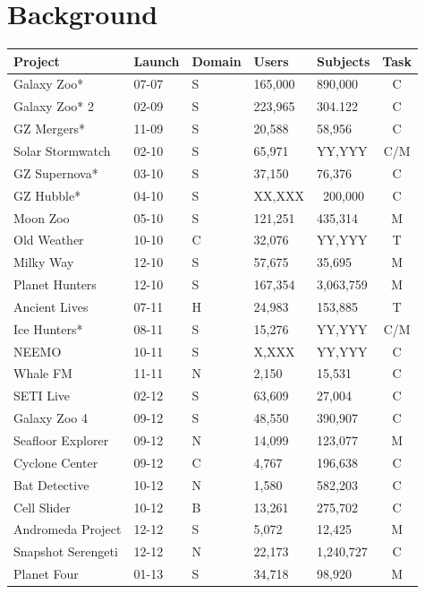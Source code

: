 \documentclass{sigchi}
\begin{document}
\section{Background}
\begin{table}
\begin{center}
\small
\begin{tabular}{p{2.2cm}lp{0.7cm}llc}
\hline
Project  & Launch & Domain & Users & Subjects & Task \\
\hline
\hline
Galaxy Zoo* & 07-07 & S & 165,000 & 890,000 & C \\
\hline
Galaxy Zoo* 2 & 02-09 & S & 223,965 & 304.122 & C \\
GZ Mergers* & 11-09 & S & 20,588 & 58,956 & C \\
\hline
Solar Stormwatch & 02-10 & S & 65,971 & YY,YYY & C/M \\
GZ Supernova* & 03-10 & S & 37,150 & 76,376 & C \\
GZ Hubble* & 04-10 & S & XX,XXX & ~200,000 & C \\
Moon Zoo & 05-10 & S & 121,251 & 435,314 & M \\
Old Weather & 10-10 & C & 32,076 & YY,YYY & T \\
Milky Way & 12-10 & S & 57,675 & 35,695 & M \\
Planet Hunters & 12-10 & S & 167,354 & 3,063,759 & M \\
\hline
Ancient Lives & 07-11 & H & 24,983 & 153,885 & T \\
Ice Hunters* & 08-11 & S & 15,276 & YY,YYY & C/M \\
NEEMO & 10-11 & S & X,XXX & YY,YYY & C \\
Whale FM & 11-11 & N & 2,150 & 15,531 & C \\
\hline
SETI Live & 02-12 & S & 63,609 & 27,004 & C \\
Galaxy Zoo 4 & 09-12 & S & 48,550 & 390,907 & C \\
Seafloor Explorer & 09-12 & N & 14,099 & 123,077 & M \\
Cyclone Center & 09-12 & C & 4,767 & 196,638 & C \\
Bat Detective & 10-12 & N & 1,580 & 582,203 & C \\
Cell Slider & 10-12 & B & 13,261 & 275,702 & C \\
Andromeda Project & 12-12 & S & 5,072 & 12,425 & M \\
Snapshot Serengeti & 12-12 & N & 22,173 & 1,240,727 & C \\
\hline
Planet Four & 01-13 & S & 34,718 & 98,920 & M \\

\end{tabular}
\end{center}
\end{table}
\end{document}
